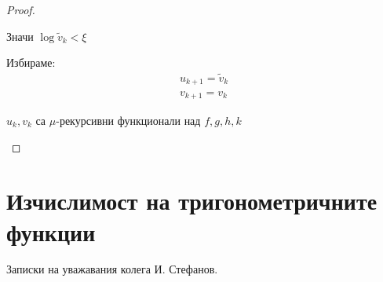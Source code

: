 \begin{proof}
\begin{itemize}
\begin{itemize}
            Значи $\log \tilde v_k < \xi$

            Избираме:
            \begin{equation}
                \begin{split}
                    u_{k+1} = \tilde v_k \\
                    v_{k+1} = v_k
                \end{split}
            \end{equation}
        \end{itemize}
        $u_k, v_k$ са $\mu$-рекурсивни функционали над $f,g,h,k$
    \end{itemize}
\end{proof}

\section{Изчислимост на тригонометричните функции}
Записки на уважавания колега И. Стефанов.

